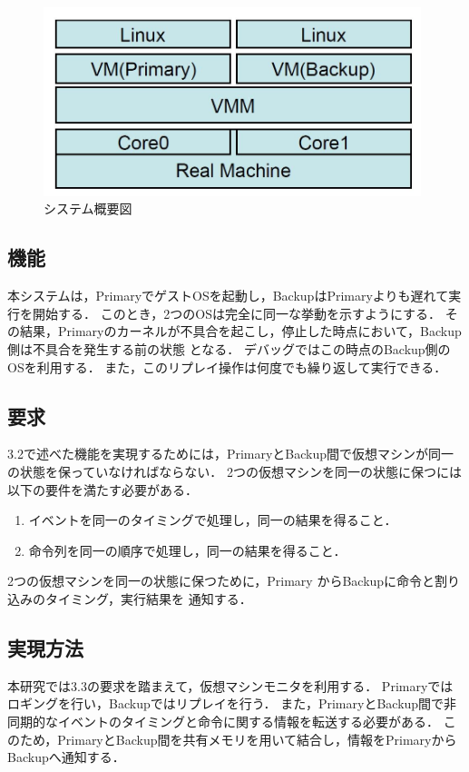\documentclass[12pt]{jsarticle}
\begin{document}
\begin{figure}[t]
\begin{center}
\includegraphics[height=5.5cm]{./fig1.jpg}          
\caption{システム概要図}
\label{fig:up}
\end{center}
\end{figure}





\subsection{機能}
本システムは，PrimaryでゲストOSを起動し，BackupはPrimaryよりも遅れて実行を開始する．
このとき，2つのOSは完全に同一な挙動を示すようにする．
その結果，Primaryのカーネルが不具合を起こし，停止した時点において，Backup側は不具合を発生する前の状態
となる．
デバッグではこの時点のBackup側のOSを利用する．
また，このリプレイ操作は何度でも繰り返して実行できる．

\subsection{要求}
3.2で述べた機能を実現するためには，PrimaryとBackup間で仮想マシンが同一の状態を保っていなければならない．
2つの仮想マシンを同一の状態に保つには以下の要件を満たす必要がある．
\begin{enumerate}
\item イベントを同一のタイミングで処理し，同一の結果を得ること．
\item 命令列を同一の順序で処理し，同一の結果を得ること．
\end{enumerate}
2つの仮想マシンを同一の状態に保つために，Primary からBackupに命令と割り込みのタイミング，実行結果を
通知する．

\subsection{実現方法}
本研究では3.3の要求を踏まえて，仮想マシンモニタを利用する．
Primaryではロギングを行い，Backupではリプレイを行う．
また，PrimaryとBackup間で非同期的なイベントのタイミングと命令に関する情報を転送する必要がある．
このため，PrimaryとBackup間を共有メモリを用いて結合し，情報をPrimaryからBackupへ通知する．
\end{document}
